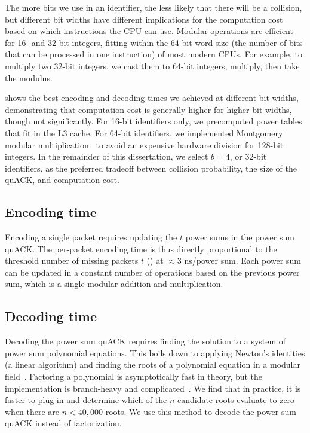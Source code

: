 The more bits we use in an identifier, the less likely that there will be a
collision, but different bit widths have different implications for the
computation cost based on which instructions the CPU can use. Modular
operations are efficient for 16- and 32-bit integers, fitting within the 64-bit
word size (the number of bits that can be processed in one instruction) of most
modern CPUs. For example, to multiply two 32-bit integers, we cast them to
64-bit integers, multiply, then take the modulus.

 shows the best encoding and decoding times we achieved
at different bit widths, demonstrating that computation cost is generally higher
for higher bit widths, though not significantly. For 16-bit identifiers only, we
precomputed power tables that fit in the L3 cache. For 64-bit identifiers, we
implemented Montgomery modular multiplication~\cite{montgomery1985modular}
to avoid an expensive hardware division for 128-bit integers. In the remainder
of this dissertation, we select $b=4$, or 32-bit identifiers, as the preferred
tradeoff between collision probability, the size of the quACK, and computation
cost.

\subsection{Encoding time}
\label{sec:quack:psum-microbenchmarks:encoding}

Encoding a single packet requires updating the $t$ power sums in the power sum
quACK.
The per-packet encoding time is thus directly proportional to the threshold
number of missing packets $t$ () at
$\approx 3$ ns/power sum.
Each power sum can be updated in a constant number of operations based on the
previous power sum, which is a single modular addition and multiplication.

\subsection{Decoding time}
\label{sec:quack:psum-microbenchmarks:decoding}

Decoding the power sum quACK requires finding the solution to a system of power
sum polynomial equations. This boils down to applying Newton's identities (a
linear algorithm) and finding the roots of a polynomial equation in a modular
field~\cite{eppstein2011straggler}.
Factoring a polynomial is asymptotically fast in theory, but the implementation
is branch-heavy and complicated~\cite{parigp2018}.
We find that in practice, it is faster to plug in and determine which of the
$n$ candidate roots evaluate to zero when there are $n < 40,000$ roots.
We use this method to decode the power sum quACK instead of factorization.

